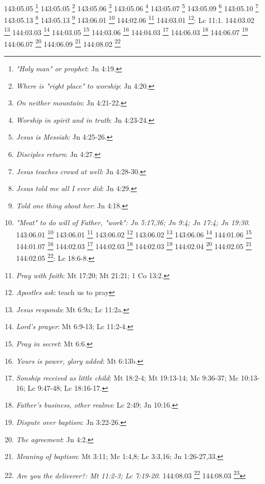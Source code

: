 {{{{{{{{{{{{{{{{{{{{{{{{{{{{143:05.05 \footnote{\textit{"Holy man" or prophet}: Jn 4:19.}
143:05.05 \footnote{\textit{Where is "right place" to worship}: Jn 4:20.}
143:05.06 \footnote{\textit{On neither mountain}: Jn 4:21-22.}
143:05.06 \footnote{\textit{Worship in spirit and in truth}: Jn 4:23-24.}
143:05.07 \footnote{\textit{Jesus is Messiah}: Jn 4:25-26.}
143:05.09 \footnote{\textit{Disciples return}: Jn 4:27.}
143:05.10 \footnote{\textit{Jesus teaches crowd at well}: Jn 4:28-30.}
143:05.13 \footnote{\textit{Jesus told me all I ever did}: Jn 4:29.}
143:05.13 \footnote{\textit{Told one thing about her}: Jn 4:18.}
143:06.01 \footnote{\textit{"Meat" to do will of Father, "work": Jn 5:17,36; Jn 9:4; Jn 17:4; Jn 19:30.}
143:06.01 \footnote{\textit{Jesus asked to eat}: Jn 4:31.}
143:06.01 \footnote{\textit{Jesus had "meat" no one knows}: Jn 4:32-38.}
143:06.02 \footnote{\textit{Jesus' apostles not baptizing}: Jn 3:22b,26b.}
143:06.02 \footnote{\textit{Preaching on Gerizim}: Jn 4:39-41.}
143:06.06 \footnote{\textit{Groundwork for Philip}: Hch 8:5-8.}
144:01.06 \footnote{\textit{Teach us how to pray}: Lc 11:1.}
144:01.07 \footnote{\textit{John's disciples prayer}: Lc 11:1b.}
144:02.03 \footnote{\textit{Ask -- receive}: Mt 7:7-8; Mc 11:24; Jn 14:13-14; Jn 16:24.}
144:02.03 \footnote{\textit{Ask, seek, knock}: Mt 21:22; Lc 11:5-10.}
144:02.03 \footnote{\textit{Parable of neighbor & loaves}: Lc 11:5-8.}
144:02.04 \footnote{\textit{Appropriate gifts to son}: Mt 7:9-11; Lc 11:11-13.}
144:02.05 \footnote{\textit{Parable of haughty judge}: Lc 18:1-5.}
144:02.05 \footnote{\textit{Point}: persistence pays}: Lc 18:6-8.}
144:02.06 \footnote{\textit{Pray with faith}: Mt 17:20; Mt 21:21; 1 Co 13:2.}
144:03.01 \footnote{\textit{Apostles ask}: teach us to pray}: Lc 11:1.}
144:03.02 \footnote{\textit{Jesus responds}: Mt 6:9a; Lc 11:2a.}
144:03.03 \footnote{\textit{Lord's prayer}: Mt 6:9-13; Lc 11:2-4.}
144:03.05 \footnote{\textit{Pray in secret}: Mt 6:6.}
144:03.06 \footnote{\textit{Yours is power, glory added}: Mt 6:13b.}
144:04.03 \footnote{\textit{Sonship received as little child}: Mt 18:2-4; Mt 19:13-14; Mc 9:36-37; Mc 10:13-16; Lc 9:47-48; Lc 18:16-17.}
144:06.03 \footnote{\textit{Father's business, other realms}: Lc 2:49; Jn 10:16.}
144:06.07 \footnote{\textit{Dispute over baptism}: Jn 3:22-26.}
144:06.07 \footnote{\textit{The agreement}: Jn 4:2.}
144:06.09 \footnote{\textit{Meaning of baptism}: Mt 3:11; Mc 1:4,8; Lc 3:3,16; Jn 1:26-27,33.}
144:08.02 \footnote{\textit{Are you the deliverer?: Mt 11:2-3; Lc 7:19-20.}
144:08.03 \footnote{\textit{About John the Baptist}: Mt 11:7-10; Lc 7:24-27.}
144:08.03 \footnote{\textit{Good tidings preached to poor}: Is 61:1-2; Mt 11:4-5; Lc 4:18; Lc 7:21-22.}
}}}}}}}}}}}}}}}}}}}}}}}}}}}}
